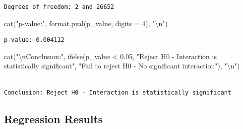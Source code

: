 \documentclass[
  11pt,
]{article}
\newenvironment{Shaded}{\begin{snugshade}}{\end{snugshade}}
\newcommand{\AttributeTok}[1]{\textcolor[rgb]{0.40,0.45,0.13}{#1}}
\newcommand{\DecValTok}[1]{\textcolor[rgb]{0.68,0.00,0.00}{#1}}
\newcommand{\FloatTok}[1]{\textcolor[rgb]{0.68,0.00,0.00}{#1}}
\newcommand{\FunctionTok}[1]{\textcolor[rgb]{0.28,0.35,0.67}{#1}}
\newcommand{\NormalTok}[1]{\textcolor[rgb]{0.00,0.23,0.31}{#1}}
\newcommand{\SpecialCharTok}[1]{\textcolor[rgb]{0.37,0.37,0.37}{#1}}
\newcommand{\StringTok}[1]{\textcolor[rgb]{0.13,0.47,0.30}{#1}}
\begin{document}
\begin{verbatim}
Degrees of freedom: 2 and 26652 
\end{verbatim}

\begin{Shaded}
\begin{Highlighting}[]
\FunctionTok{cat}\NormalTok{(}\StringTok{"p{-}value:"}\NormalTok{, }\FunctionTok{format.pval}\NormalTok{(p\_value, }\AttributeTok{digits =} \DecValTok{4}\NormalTok{), }\StringTok{"}\SpecialCharTok{\textbackslash{}n}\StringTok{"}\NormalTok{)}
\end{Highlighting}
\end{Shaded}

\begin{verbatim}
p-value: 0.004112 
\end{verbatim}

\begin{Shaded}
\begin{Highlighting}[]
\FunctionTok{cat}\NormalTok{(}\StringTok{"}\SpecialCharTok{\textbackslash{}n}\StringTok{Conclusion:"}\NormalTok{, }\FunctionTok{ifelse}\NormalTok{(p\_value }\SpecialCharTok{\textless{}} \FloatTok{0.05}\NormalTok{, }
                          \StringTok{"Reject H0 {-} Interaction is statistically significant"}\NormalTok{,}
                          \StringTok{"Fail to reject H0 {-} No significant interaction"}\NormalTok{), }\StringTok{"}\SpecialCharTok{\textbackslash{}n}\StringTok{"}\NormalTok{)}
\end{Highlighting}
\end{Shaded}

\begin{verbatim}

Conclusion: Reject H0 - Interaction is statistically significant 
\end{verbatim}

\subsection{Regression Results}\label{regression-results}
\end{document}
